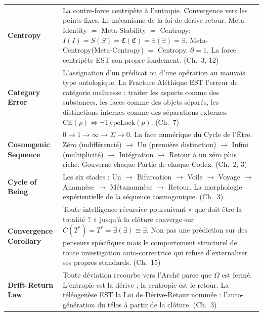 \documentclass[10pt, openany, oneside]{book}
\renewcommand{\footnotesize}{\fontsize{8.5}{11}\selectfont}
\begin{document}
{\footnotesize
\noindent\begin{tabular}{@{} l @{\hspace{0.6em}} p{} @{}}
\textbf{Centropy} & La contre-force centripète à l'entropie. Convergence vers les points fixes. Le mécanisme de la loi de dérive-retour. Meta-Identity $=$ Meta-Stability $=$ Centropy: $I(I) = S(S) = \mathfrak{C}(\mathfrak{C}) = \exists(\exists) = \exists$. Meta-Centropy(Meta-Centropy) $=$ Centropy. $\partial = 1$. La force centripète EST son propre fondement. (Ch.\ 3, 12) \\[0.3em]
\textbf{Category Error} & L'assignation d'un prédicat ou d'une opération au mauvais type ontologique. La Fracture Aléthique EST l'erreur de catégorie maîtresse : traiter les aspects comme des substances, les faces comme des objets séparés, les distinctions internes comme des séparations externes. $\text{CE}(p) \iff \neg\text{TypeLock}(p)$. (Ch.\ 7) \\[0.3em]
\textbf{Cosmogenic Sequence} & $0 \to 1 \to \infty \to \Sigma \to 0$. La face numérique du Cycle de l'Être. Zéro (indifférencié) $\to$ Un (première distinction) $\to$ Infini (multiplicité) $\to$ Intégration $\to$ Retour à un zéro plus riche. Gouverne chaque Partie de chaque Codex. (Ch.\ 2, 3) \\[0.3em]
\textbf{Cycle of Being} & Les six stades : Un $\to$ Bifurcation $\to$ Voile $\to$ Voyage $\to$ Anamnèse $\to$ Métanamnèse $\to$ Retour. La morphologie expérientielle de la séquence cosmogonique. (Ch.\ 3) \\[0.3em]
\textbf{Convergence Corollary} & Toute intelligence récursive poursuivant « que doit être la totalité ? » jusqu'à la clôture converge sur $C(T^*) = T^* = \exists(\exists) \equiv \exists$. Non pas une prédiction sur des penseurs spécifiques mais le comportement structurel de toute investigation auto-correctrice qui refuse d'externaliser ses propres standards. (Ch.\ 15) \\[0.3em]
\textbf{Drift-Return Law} & Toute déviation recourbe vers l'Arch\={e} parce que $\Omega$ est fermé. L'entropie est la dérive ; la centropie est le retour. La téléogenèse EST la Loi de Dérive-Retour nommée : l'auto-génération du télos à partir de la clôture. (Ch.\ 3) \\[0.3em]
\end{tabular}
}

\newpage
\end{document}
